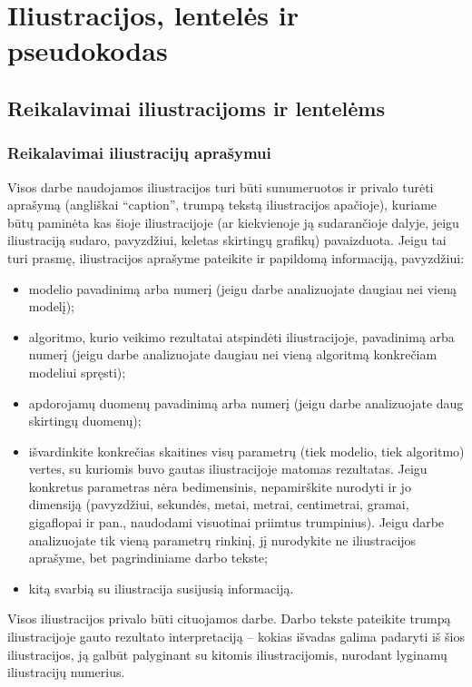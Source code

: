 \documentclass[a4paper,12pt]{article}
\begin{document}
 {}{}{}{}%
 {}

\tableofcontents

 
\newpage
\section{Iliustracijos, lentelės ir pseudokodas}

\subsection{Reikalavimai iliustracijoms ir lentelėms}

\subsubsection{Reikalavimai iliustracijų aprašymui}

Visos darbe naudojamos iliustracijos turi būti sunumeruotos ir privalo turėti aprašymą (angliškai ``caption'', trumpą tekstą iliustracijos apačioje),
kuriame būtų paminėta kas šioje iliustracijoje (ar kiekvienoje ją sudarančioje dalyje, jeigu iliustraciją sudaro, pavyzdžiui, keletas skirtingų grafikų) pavaizduota.
Jeigu tai turi prasmę, iliustracijos aprašyme pateikite ir papildomą informaciją, pavyzdžiui:
\begin{itemize}[ noitemsep, topsep=5pt ]

\item
modelio pavadinimą arba numerį (jeigu darbe analizuojate daugiau nei vieną modelį);

\item
algoritmo, kurio veikimo rezultatai atspindėti iliustracijoje, pavadinimą arba numerį (jeigu darbe analizuojate daugiau nei vieną algoritmą konkrečiam modeliui spręsti);

\item
apdorojamų duomenų pavadinimą arba numerį (jeigu darbe analizuojate daug skirtingų duomenų);

\item
išvardinkite konkrečias skaitines visų parametrų (tiek modelio, tiek algoritmo) vertes, su kuriomis buvo gautas iliustracijoje matomas rezultatas.
Jeigu konkretus parametras nėra bedimensinis, nepamirškite nurodyti ir jo dimensiją
(pavyzdžiui, sekundės, metai, metrai, centimetrai, gramai, gigaflopai ir pan., naudodami visuotinai priimtus trumpinius).
Jeigu darbe analizuojate tik vieną parametrų rinkinį, jį nurodykite ne iliustracijos aprašyme, bet pagrindiniame darbo tekste;

\item
kitą svarbią su iliustracija susijusią informaciją.

\end{itemize}
Visos iliustracijos privalo būti cituojamos darbe.
Darbo tekste pateikite trumpą iliustracijoje gauto rezultato interpretaciją -- kokias išvadas galima padaryti iš šios iliustracijos,
ją galbūt palyginant su kitomis iliustracijomis, nurodant lyginamų iliustracijų numerius.
\end{document}
